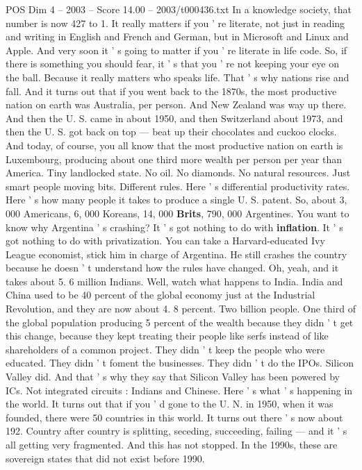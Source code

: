 \begin{textsample}{POS Dim 4 – 2003 – Score 14.00 – 2003/t000436.txt}
In a knowledge society, that number is now 427 to 1.
It really matters if you ' re literate, not just in reading and writing in English and French and German, but in Microsoft and Linux and Apple.
And very soon it ' s going to matter if you ' re literate in life code.
So, if there is something you should fear, it ' s that you ' re not keeping your eye on the ball.
Because it really matters who speaks life.
That ' s why nations rise and fall.
And it turns out that if you went back to the 1870s, the most productive nation on earth was Australia, per person.
And New Zealand was way up there.
And then the U.
S. came in about 1950, and then Switzerland about 1973, and then the U.
S. got back on top — beat up their chocolates and cuckoo clocks.
And today, of course, you all know that the most productive nation on earth is Luxembourg, producing about one third more wealth per person per year than America.
Tiny landlocked state.
No oil.
No diamonds.
No natural resources.
Just smart people moving bits.
Different rules.
Here ' s differential productivity rates.
Here ' s how many people it takes to produce a single U.
S. patent.
So, about 3, 000 Americans, 6, 000 Koreans, 14, 000 \textbf{Brits}, 790, 000 Argentines.
You want to know why Argentina ' s crashing?
It ' s got nothing to do with \textbf{inflation}.
It ' s got nothing to do with privatization.
You can take a Harvard-educated Ivy League economist, stick him in charge of Argentina.
He still crashes the country because he doesn ' t understand how the rules have changed.
Oh, yeah, and it takes about 5. 6 million Indians.
Well, watch what happens to India.
India and China used to be 40 percent of the global economy just at the Industrial Revolution, and they are now about 4. 8 percent.
Two billion people.
One third of the global population producing 5 percent of the wealth because they didn ' t get this change, because they kept treating their people like serfs instead of like shareholders of a common project.
They didn ' t keep the people who were educated.
They didn ' t foment the businesses.
They didn ' t do the IPOs.
Silicon Valley did.
And that ' s why they say that Silicon Valley has been powered by ICs.
Not integrated circuits : Indians and Chinese.
Here ' s what ' s happening in the world.
It turns out that if you ' d gone to the U.
N. in 1950, when it was founded, there were 50 countries in this world.
It turns out there ' s now about 192.
Country after country is splitting, seceding, succeeding, failing — and it ' s all getting very fragmented.
And this has not stopped.
In the 1990s, these are sovereign states that did not exist before 1990.

\end{textsample}
